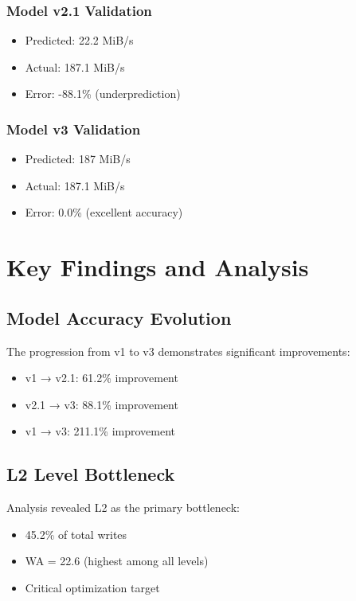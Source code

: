 \documentclass[11pt,twocolumn]{article}
\begin{document}
\subsubsection{Model v2.1 Validation}
\begin{itemize}
    \item Predicted: 22.2 MiB/s
    \item Actual: 187.1 MiB/s
    \item Error: -88.1\% (underprediction)
\end{itemize}

\subsubsection{Model v3 Validation}
\begin{itemize}
    \item Predicted: 187 MiB/s
    \item Actual: 187.1 MiB/s
    \item Error: 0.0\% (excellent accuracy)
\end{itemize}

\section{Key Findings and Analysis}

\subsection{Model Accuracy Evolution}

The progression from v1 to v3 demonstrates significant improvements:
\begin{itemize}
    \item v1 → v2.1: 61.2\% improvement
    \item v2.1 → v3: 88.1\% improvement
    \item v1 → v3: 211.1\% improvement
\end{itemize}

\subsection{L2 Level Bottleneck}

Analysis revealed L2 as the primary bottleneck:
\begin{itemize}
    \item 45.2\% of total writes
    \item WA = 22.6 (highest among all levels)
    \item Critical optimization target
\end{itemize}
\end{document}
